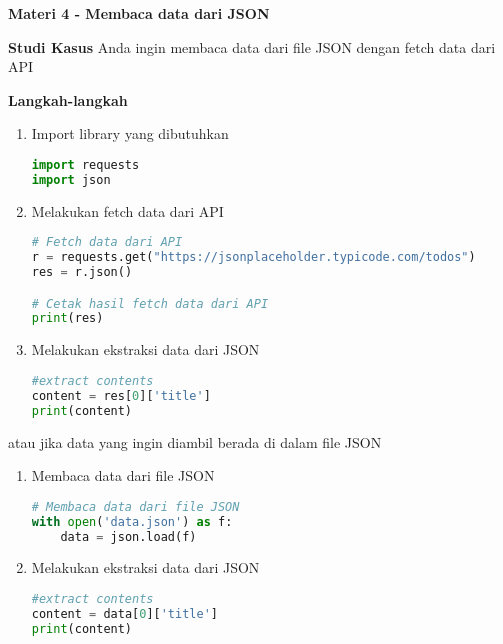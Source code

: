 \documentclass{article}
\begin{document}
    \begin{flushleft}
        \textbf{Materi 4 - Membaca data dari JSON}
        \newline

        \textbf{Studi Kasus}
        \newline
        Anda ingin membaca data dari file JSON dengan fetch data dari API
        \newline

        \textbf{Langkah-langkah}

        \begin{enumerate}
            \item Import library yang dibutuhkan
            \lstset{style=pythonstyle}
            \begin{lstlisting}[language=python]
import requests
import json
            \end{lstlisting}

            \item Melakukan fetch data dari API
            \lstset{style=pythonstyle}
            \begin{lstlisting}[language=python]
# Fetch data dari API
r = requests.get("https://jsonplaceholder.typicode.com/todos")
res = r.json()

# Cetak hasil fetch data dari API
print(res)
            \end{lstlisting}

            \item Melakukan ekstraksi data dari JSON
            \lstset{style=pythonstyle}
            \begin{lstlisting}[language=python]
#extract contents
content = res[0]['title']
print(content)
            \end{lstlisting}
        \end{enumerate}

        atau jika data yang ingin diambil berada di dalam file JSON

        \begin{enumerate}
            \item Membaca data dari file JSON
            \lstset{style=pythonstyle}
            \begin{lstlisting}[language=python]
# Membaca data dari file JSON
with open('data.json') as f:
    data = json.load(f)
            \end{lstlisting}

            \item Melakukan ekstraksi data dari JSON
            \lstset{style=pythonstyle}
            \begin{lstlisting}[language=python]
#extract contents
content = data[0]['title']
print(content)
            \end{lstlisting}
        \end{enumerate}
    \end{flushleft}
\end{document}
